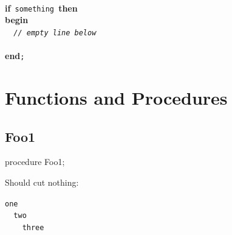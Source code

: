 \documentclass{report}
\begin{document}
\begin{description}
\texttt{\\\nopagebreak[3]
}\textbf{if}\texttt{~something~}\textbf{then}\texttt{\\\nopagebreak[3]
}\textbf{begin}\texttt{\\\nopagebreak[3]
~~\textit{//~empty~line~below}\\\nopagebreak[3]
\\\nopagebreak[3]
}\textbf{end}\texttt{;\\
}
\end{description}
\section{Functions and Procedures}
\subsection*{Foo1}
\begin{list}{}{
\setlength{\itemindent}{0cm}
\setlength{\listparindent}{0cm}
\setlength{\leftmargin}{\evensidemargin}
\addtolength{\leftmargin}{\tmplength}
\settowidth{\labelsep}{X}
\addtolength{\leftmargin}{\labelsep}
\setlength{\labelwidth}{\tmplength}
}
\begin{flushleft}
\item[\textbf{Declaration}\hfill]
\begin{ttfamily}
procedure Foo1;\end{ttfamily}


\end{flushleft}
\par
\item[\textbf{Description}]
Should cut nothing:

\texttt{one\\\nopagebreak[3]
~~two\\\nopagebreak[3]
~~~~three\\
}

\end{list}
\end{document}
